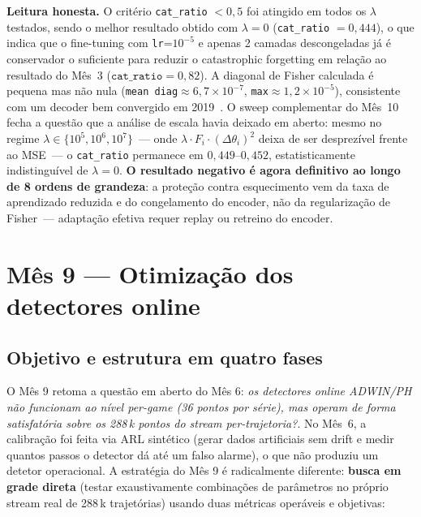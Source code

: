 \documentclass[11pt,a4paper]{article}
\begin{document}
\textbf{Leitura honesta.} O crit\'erio \texttt{cat\_ratio} $< 0{,}5$ foi
atingido em todos os $\lambda$ testados, sendo o melhor resultado obtido
com $\lambda=0$ (\texttt{cat\_ratio} $= 0{,}444$), o que indica que o
fine-tuning com \texttt{lr}=$10^{-5}$ e apenas 2 camadas descongeladas
j\'a \'e conservador o suficiente para reduzir o catastrophic forgetting
em rela\c{c}\~ao ao resultado do M\^es~3 ($\texttt{cat\_ratio} = 0{,}82$).
A diagonal de Fisher calculada \'e pequena mas n\~ao nula
(\texttt{mean diag}$\approx 6{,}7\!\times\!10^{-7}$, \texttt{max}$\approx 1{,}2\!\times\!10^{-5}$), consistente com um decoder bem convergido em 2019~\cite{kirkpatrick2017}.
O sweep complementar do M\^es~10 fecha a quest\~ao que a an\'alise de
escala havia deixado em aberto: mesmo no regime
$\lambda\!\in\!\{10^5, 10^6, 10^7\}$~--- onde
$\lambda\!\cdot\!F_i\!\cdot\!(\Delta\theta_i)^2$ deixa de ser
desprez\'ivel frente ao MSE~--- o \texttt{cat\_ratio} permanece em
$0{,}449$--$0{,}452$, estatisticamente indistingu\'ivel de $\lambda=0$.
\textbf{O resultado negativo \'e agora definitivo ao longo de 8 ordens
de grandeza}: a prote\c{c}\~ao contra esquecimento vem da taxa de
aprendizado reduzida e do congelamento do encoder, n\~ao da
regulariza\c{c}\~ao de Fisher~--- adapta\c{c}\~ao efetiva requer replay
ou retreino do encoder.

\section{M\^es 9 --- Otimiza\c{c}\~ao dos detectores online}
\label{sec:mes9}

\subsection{Objetivo e estrutura em quatro fases}

O M\^es 9 retoma a quest\~ao em aberto do M\^es 6: \emph{os detectores online ADWIN/PH n\~ao funcionam ao n\'ivel per-game (36 pontos por s\'erie), mas operam de forma satisfat\'oria sobre os 288\,k pontos do stream per-trajetoria?}. No M\^es~6, a calibra\c{c}\~ao foi feita via ARL sint\'etico (gerar dados artificiais sem drift e medir quantos passos o detector d\'a at\'e um falso alarme), o que n\~ao produziu um detetor operacional. A estrat\'egia do M\^es 9 \'e radicalmente diferente: \textbf{busca em grade direta} (testar exaustivamente combina\c{c}\~oes de par\^ametros no pr\'oprio stream real de 288\,k trajet\'orias) usando duas m\'etricas oper\'aveis e objetivas:
\end{document}
